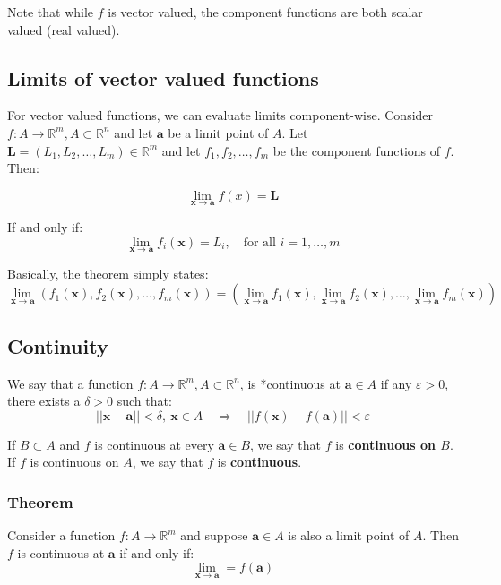\documentclass[11pt]{article}
\begin{document}
Note that while \(f\) is vector valued, the component functions are both scalar valued (real valued).

\subsection{Limits of vector valued functions}
\label{sec:org0933023}
For vector valued functions, we can evaluate limits component-wise. Consider \(f : A \rightarrow \mathbb{R}^m, A \subset \mathbb{R}^n\) and let \(\boldsymbol{a}\) be a limit point of \(A\). Let \(\boldsymbol{L} = (L_1, L_2, \ldots, L_m) \in \mathbb{R}^m\) and let \(f_1, f_2, \ldots, f_m\) be the component functions of \(f\). Then:

\[\lim_{\boldsymbol{x} \rightarrow \boldsymbol{a}} f(x) = \boldsymbol{L}\]

If and only if:
\[\lim_{\boldsymbol{x} \rightarrow \boldsymbol{a}} f_i (\boldsymbol{x}) = L_i, \quad \text{for all } i = 1, \ldots, m\]

Basically, the theorem simply states:
\[\lim_{\boldsymbol{x} \rightarrow \boldsymbol{a}} (f_1 (\boldsymbol{x}), f_2(\boldsymbol{x}), \ldots, f_m(\boldsymbol{x})) = \left(\lim_{\boldsymbol{x} \rightarrow \boldsymbol{a}} f_1(\boldsymbol{x}), \lim_{\boldsymbol{x} \rightarrow \boldsymbol{a}} f_2 (\boldsymbol{x}), \ldots, \lim_{\boldsymbol{x} \rightarrow \boldsymbol{a}} f_m (\boldsymbol{x}) \right)\]

\subsection{Continuity}
\label{sec:orgac7abab}
We say that a function \(f : A \rightarrow \mathbb{R}^m, A \subset \mathbb{R}^n\), is *continuous at \(\boldsymbol{a} \in A\) if any \(\varepsilon > 0\), there exists a \(\delta > 0\) such that:
\[||\boldsymbol{x} - \boldsymbol{a}|| < \delta, \ \boldsymbol{x} \in A \quad \Rightarrow \quad ||f(\boldsymbol{x}) - f(\boldsymbol{a})|| < \varepsilon\]

If \(B \subset A\) and \(f\) is continuous at every \(\boldsymbol{a} \in B\), we say that \(f\) is \textbf{continuous on \(B\)}. If \(f\) is continuous on \(A\), we say that \(f\) is \textbf{continuous}.

\subsubsection{Theorem}
\label{sec:org503f883}
Consider a function \(f : A \rightarrow \mathbb{R}^m\) and suppose \(\boldsymbol{a} \in A\) is also a limit point of \(A\). Then \(f\) is continuous at \(\boldsymbol{a}\) if and only if:
\[\lim_{\boldsymbol{x} \rightarrow \boldsymbol{a}} = f(\boldsymbol{a})\]
\end{document}
